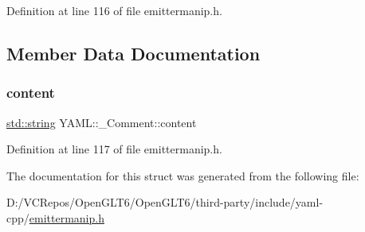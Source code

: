 Definition at line 116 of file emittermanip.\+h.



\subsection{Member Data Documentation}
\mbox{\label{struct_y_a_m_l_1_1___comment_a001ad5bfc16a31e2fd69afe3477d2025}} 
\subsubsection{\texorpdfstring{content}{content}}
{\footnotesize\ttfamily \mbox{\hyperlink{glad_8h_ac83513893df92266f79a515488701770}{std\+::string}} Y\+A\+M\+L\+::\+\_\+\+Comment\+::content}



Definition at line 117 of file emittermanip.\+h.



The documentation for this struct was generated from the following file\+:\begin{DoxyCompactItemize}
\item 
D\+:/\+V\+C\+Repos/\+Open\+G\+L\+T6/\+Open\+G\+L\+T6/third-\/party/include/yaml-\/cpp/\mbox{\hyperlink{emittermanip_8h}{emittermanip.\+h}}\end{DoxyCompactItemize}
